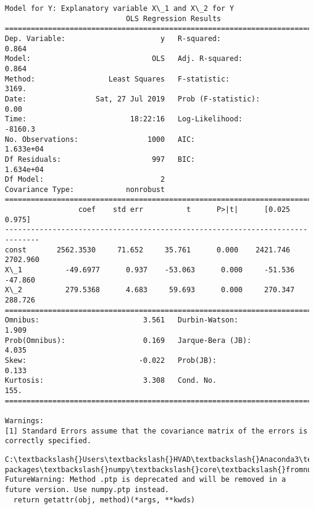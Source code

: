\documentclass[11pt]{article}
\begin{document}
    \begin{Verbatim}[commandchars=\\\{\}]
Model for Y: Explanatory variable X\_1 and X\_2 for Y
                            OLS Regression Results                            
==============================================================================
Dep. Variable:                      y   R-squared:                       0.864
Model:                            OLS   Adj. R-squared:                  0.864
Method:                 Least Squares   F-statistic:                     3169.
Date:                Sat, 27 Jul 2019   Prob (F-statistic):               0.00
Time:                        18:22:16   Log-Likelihood:                -8160.3
No. Observations:                1000   AIC:                         1.633e+04
Df Residuals:                     997   BIC:                         1.634e+04
Df Model:                           2                                         
Covariance Type:            nonrobust                                         
==============================================================================
                 coef    std err          t      P>|t|      [0.025      0.975]
------------------------------------------------------------------------------
const       2562.3530     71.652     35.761      0.000    2421.746    2702.960
X\_1          -49.6977      0.937    -53.063      0.000     -51.536     -47.860
X\_2          279.5368      4.683     59.693      0.000     270.347     288.726
==============================================================================
Omnibus:                        3.561   Durbin-Watson:                   1.909
Prob(Omnibus):                  0.169   Jarque-Bera (JB):                4.035
Skew:                          -0.022   Prob(JB):                        0.133
Kurtosis:                       3.308   Cond. No.                         155.
==============================================================================

Warnings:
[1] Standard Errors assume that the covariance matrix of the errors is correctly specified.

    \end{Verbatim}

    \begin{Verbatim}[commandchars=\\\{\}]
C:\textbackslash{}Users\textbackslash{}HVAD\textbackslash{}Anaconda3\textbackslash{}lib\textbackslash{}site-packages\textbackslash{}numpy\textbackslash{}core\textbackslash{}fromnumeric.py:52: FutureWarning: Method .ptp is deprecated and will be removed in a future version. Use numpy.ptp instead.
  return getattr(obj, method)(*args, **kwds)

    \end{Verbatim}
\end{document}
